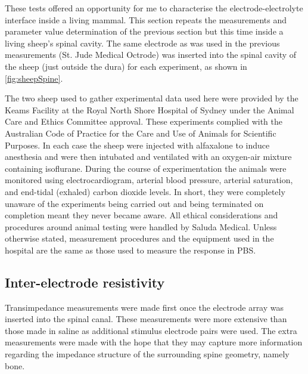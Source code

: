   These tests offered an opportunity for me to characterise the electrode-electrolyte interface inside a living mammal.
  This section repeats the measurements and parameter value determination of the previous section but this time inside a living sheep's spinal cavity.
  The same electrode as was used in the previous measurements (St. Jude Medical Octrode) was inserted into the spinal cavity of the sheep (just outside the dura) for each experiment, as shown in \cref{fig:sheepSpine}.

  The two sheep used to gather experimental data used here were provided by the Keams Facility at the Royal North Shore Hospital of Sydney under the Animal Care and Ethics Committee approval.
  These experiments complied with the Australian Code of Practice for the Care and Use of Animals for Scientific Purposes.
  In each case the sheep were injected with alfaxalone to induce anesthesia and were then intubated and ventilated with an oxygen-air mixture containing isoflurane.
  During the course of experimentation the animals were monitored using electrocardiogram, arterial blood pressure, arterial saturation, and end-tidal (exhaled) carbon dioxide levels.
  In short, they were completely unaware of the experiments being carried out and being terminated on completion meant they never became aware.
  All ethical considerations and procedures around animal testing were handled by Saluda Medical.
  Unless otherwise stated, measurement procedures and the equipment used in the hospital are the same as those used to measure the response in PBS.

  \subsection{Inter-electrode resistivity}

    Transimpedance measurements were made first once the electrode array was inserted into the spinal canal.
    These measurements were more extensive than those made in saline as additional stimulus electrode pairs were used.
    The extra measurements were made with the hope that they may capture more information regarding the impedance structure of the surrounding spine geometry, namely bone.

